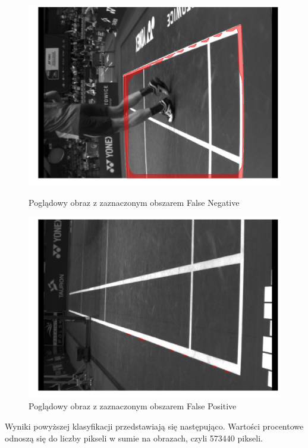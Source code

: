 \begin{figure}[!htb]
    \includegraphics[width=\linewidth]{original_fn_1564911595553287247.jpg}
    \caption{Poglądowy obraz z zaznaczonym obszarem False Negative}
  \endminipage\hfill
    \includegraphics[width=\linewidth]{original_fp_1564953159296706208_5.jpg}
    \caption{Poglądowy obraz z zaznaczonym obszarem False Positive}
  \endminipage\hfill
\end{figure}

\newpage

Wyniki powyższej klasyfikacji przedstawiają się następująco. Wartości procentowe odnoszą się do liczby pikseli w sumie na obrazach, czyli 573440 pikseli.

